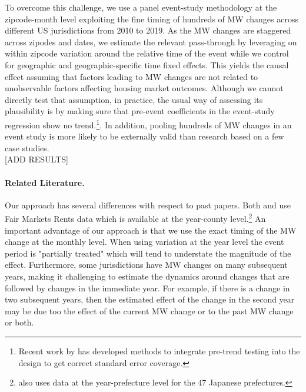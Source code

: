 To overcome this challenge, we use a panel event-study methodology \parencite{abraham2018estimating,borusyak2017revisiting} at the zipcode-month level exploiting the fine timing of hundreds of MW changes across different US jurisdictions from 2010 to 2019. As the MW changes are staggered across zipodes and dates, we estimate the relevant pass-through by leveraging on within zipcode variation around the relative time of the event while we control for geographic and geographic-specific time fixed effects. This yields the causal effect assuming that factors leading to MW changes are not related to unobservable factors affecting housing market outcomes. Although we cannot directly test that assumption, in practice, the usual way of assessing its plausibility is by making sure that pre-event coefficients in the event-study regression show no trend.\footnote{Recent work by \textcite{roth2018pre} has developed methods to integrate pre-trend testing into the design to get correct standard error coverage.}. In addition, pooling hundreds of MW changes in an event study is more likely to be externally valid than research based on a few case studies. \\

[ADD RESULTS] \\

\paragraph{Related Literature.}
Our approach has several differences with respect to past papers. Both \textcite{tidemann2018mw} and \textcite{yamagishi2019minimum} use Fair Markets Rents data which is available at the year-county level.\footnote{\textcite{yamagishi2019minimum} also uses data at the year-prefecture level for the 47 Japanese prefectures.} An important advantage of our approach is that we use the exact timing of the MW change at the monthly level. When using variation at the year level the event period is "partially treated" which will tend to understate the magnitude of the effect. Furthermore, some jurisdictions have MW changes on many subsequent years, making it challenging to estimate the dynamics around changes that are followed by changes in the immediate year. For example, if there is a change in two subsequent years, then the estimated effect of the change in the second year may be due too the effect of the current MW change or to the past MW change or both.

